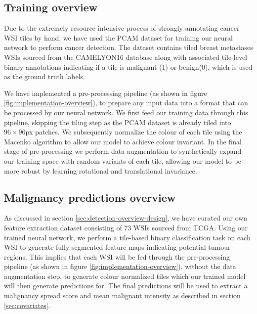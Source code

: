 \documentclass{l4proj}
\begin{document}
\subsection{Training overview}
Due to the extremely resource intensive process of strongly annotating cancer WSI tiles by hand, we have used the PCAM dataset for training our neural network to perform cancer detection. The dataset contains tiled breast metastases WSIs sourced from the CAMELYON16 database along with associated tile-level binary annotations indicating if a tile is malignant (1) or benign(0), which is used as the ground truth labels.

We have implemented a pre-processing pipeline (as shown in figure \ref{fig:implementation-overview}),  to prepare any input data into a format that can be processed by our neural network. We first feed our training data through this pipeline, skipping the tiling step as the PCAM dataset is already tiled into \(96 \times 96\)px patches. We subsequently normalize the colour of each tile using the Macenko algorithm to allow our model to achieve colour invariant. In the final stage of pre-processing we perform data augmentation to synthetically expand our training space with random variants of each tile, allowing our model to be more robust by learning rotational and translational invariance.

\subsection{Malignancy predictions overview}
As discussed in section \ref{sec:detection-overview-design}, we have curated our own feature extraction dataset consisting of 73 WSIs sourced from TCGA. Using our trained neural network, we perform a tile-based binary classification task on each WSI to generate fully segmented feature maps indicating potential tumour regions. This implies that each WSI will be fed through the pre-processing pipeline (as shown in figure \ref{fig:implementation-overview}), without the data augmentation step, to generate colour normalized tiles which our trained model will then generate predictions for. The final predictions will be used to extract a malignancy spread score and mean malignant intensity as described in section \ref{sec:covariates}.
\end{document}
